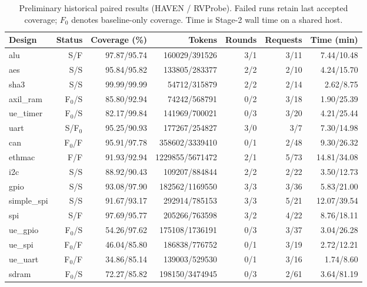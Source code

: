 \begin{table}[t]
\centering
\small
\caption{Preliminary historical paired results (HAVEN / RVProbe). Failed runs retain last accepted coverage; $F_0$ denotes baseline-only coverage. Time is Stage-2 wall time on a shared host.}
\begin{tabular}{lrrrrrr}
\hline
Design & Status & Coverage (\%) & Tokens & Rounds & Requests & Time (min) \\
\hline
alu & S/F & 97.87/95.74 & 160029/391526 & 3/1 & 3/11 & 7.44/10.48 \\
aes & S/S & 95.84/95.82 & 133805/283377 & 2/2 & 2/10 & 4.24/15.70 \\
sha3 & S/S & 99.99/99.99 & 54712/315879 & 2/2 & 2/14 & 2.62/8.75 \\
axil\_ram & F$_0$/S & 85.80/92.94 & 74242/568791 & 0/2 & 3/18 & 1.90/25.39 \\
ue\_timer & F$_0$/S & 82.17/99.84 & 141969/700021 & 0/3 & 3/20 & 4.21/25.44 \\
uart & S/F$_0$ & 95.25/90.93 & 177267/254827 & 3/0 & 3/7 & 7.30/14.98 \\
can & F$_0$/F & 95.91/97.78 & 358602/3339410 & 0/1 & 2/48 & 9.30/26.32 \\
ethmac & F/F & 91.93/92.94 & 1229855/5671472 & 2/1 & 5/73 & 14.81/34.08 \\
i2c & S/S & 88.92/90.43 & 109207/884844 & 2/2 & 2/22 & 3.50/12.73 \\
gpio & S/S & 93.08/97.90 & 182562/1169550 & 3/3 & 3/36 & 5.83/21.00 \\
simple\_spi & S/S & 91.67/93.17 & 292914/785153 & 3/3 & 5/21 & 12.07/39.54 \\
spi & S/F & 97.69/95.77 & 205266/763598 & 3/2 & 4/22 & 8.76/18.11 \\
ue\_gpio & F$_0$/S & 54.26/97.62 & 175108/1736191 & 0/3 & 3/37 & 3.04/26.28 \\
ue\_spi & F$_0$/F & 46.04/85.80 & 186838/776752 & 0/1 & 3/19 & 2.72/12.21 \\
ue\_uart & F$_0$/F & 34.86/85.14 & 139003/529530 & 0/1 & 3/16 & 1.74/8.60 \\
sdram & F$_0$/S & 72.27/85.82 & 198150/3474945 & 0/3 & 2/61 & 3.64/81.19 \\
\hline
\end{tabular}
\end{table}

